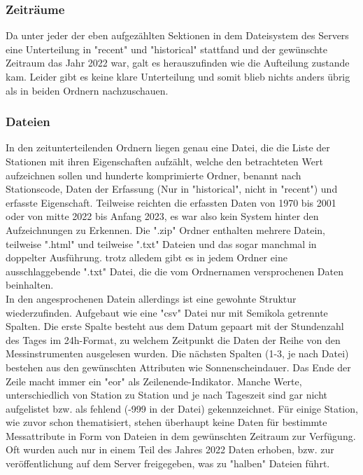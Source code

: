 \documentclass[letterpaper]{article} %
\begin{document}
            \subsubsection*{Zeiträume}
                Da unter jeder der eben aufgezählten Sektionen in dem Dateisystem des Servers eine Unterteilung in "recent" und "historical" stattfand und der gewünschte Zeitraum das Jahr 2022 war, galt es herauszufinden wie die Aufteilung zustande kam. Leider gibt es keine klare Unterteilung und somit blieb nichts anders übrig als in beiden Ordnern nachzuschauen.
            \subsubsection*{Dateien}
                In den zeitunterteilenden Ordnern liegen genau eine Datei, die die Liste der Stationen mit ihren Eigenschaften aufzählt, welche den betrachteten Wert aufzeichnen sollen und hunderte komprimierte Ordner, benannt nach Stationscode, Daten der Erfassung (Nur in "historical", nicht in "recent") und erfasste Eigenschaft. Teilweise reichten die erfassten Daten von 1970 bis 2001 oder von mitte 2022 bis Anfang 2023, es war also kein System hinter den Aufzeichnungen zu Erkennen.
                Die ".zip" Ordner enthalten mehrere Datein, teilweise ".html" und teilweise ".txt" Dateien und das sogar manchmal in doppelter Ausführung. trotz alledem gibt es in jedem Ordner eine ausschlaggebende ".txt" Datei, die die vom Ordnernamen versprochenen Daten beinhalten.
        \\
        
        In den angesprochenen Datein allerdings ist eine gewohnte Struktur wiederzufinden. Aufgebaut wie eine "csv" Datei nur mit Semikola getrennte Spalten. Die erste Spalte besteht aus dem Datum gepaart mit der Stundenzahl des Tages im 24h-Format, zu welchem Zeitpunkt die Daten der Reihe von den Messinstrumenten ausgelesen wurden. Die nächsten Spalten (1-3, je nach Datei) bestehen aus den gewünschten Attributen wie Sonnenscheindauer. Das Ende der Zeile macht immer ein "eor" als Zeilenende-Indikator.
        Manche Werte, unterschiedlich von Station zu Station und je nach Tageszeit sind gar nicht aufgelistet bzw. als fehlend (-999 in der Datei) gekennzeichnet. Für einige Station, wie zuvor schon thematisiert, stehen überhaupt keine Daten für bestimmte Messattribute in Form von Dateien in dem gewünschten Zeitraum zur Verfügung.
        Oft wurden auch nur in einem Teil des Jahres 2022 Daten erhoben, bzw. zur veröffentlichung auf dem Server freigegeben, was zu "halben" Dateien führt.
\end{document}
